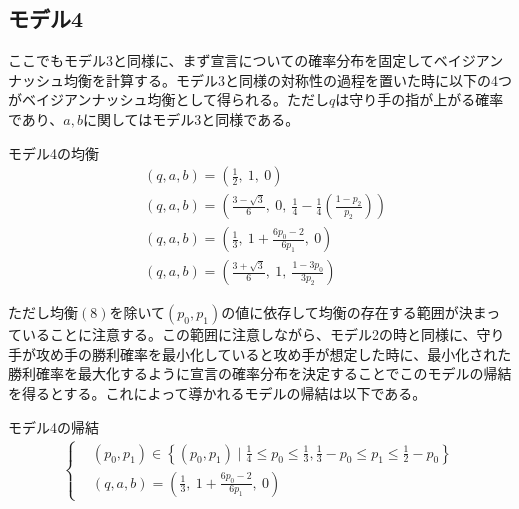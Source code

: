 \documentclass{jsarticle}
\begin{document}
\subsection{モデル4}
ここでもモデル3と同様に、まず宣言についての確率分布を固定してベイジアンナッシュ均衡を計算する。モデル3と同様の対称性の過程を置いた時に以下の4つがベイジアンナッシュ均衡として得られる。ただし$q$は守り手の指が上がる確率であり、$a,b$に関してはモデル3と同様である。
\begin{itembox}[l]{モデル4の均衡}
\begin{align}
&(q, a, b) = \left(\frac{1}{2},\ 1,\ 0\right)\\[7pt]
&(q, a, b) = \left(\frac{3 - \sqrt{3}}{6},\ 0,\ \frac{1}{4} - \frac{1}{4}\left( \frac{1-p_2}{p_2} \right) \right)\\[7pt]
&(q, a, b) = \left( \frac{1}{3},\ 1 + \frac{6p_0 - 2}{6p_1},\ 0 \right)\\[7pt]
&(q, a, b) = \left( \frac{3 + \sqrt{3}}{6},\ 1,\ \frac{1 - 3p_0}{3p_2} \right)
\end{align}
\end{itembox}
ただし均衡$(8)$を除いて$(p_0, p_1)$の値に依存して均衡の存在する範囲が決まっていることに注意する。この範囲に注意しながら、モデル2の時と同様に、守り手が攻め手の勝利確率を最小化していると攻め手が想定した時に、最小化された勝利確率を最大化するように宣言の確率分布を決定することでこのモデルの帰結を得るとする。これによって導かれるモデルの帰結は以下である。
\begin{itembox}[l]{モデル4の帰結}
\begin{align}
\begin{cases}
&(p_0, p_1) \in \left\{ (p_0, p_1) \mid \frac{1}{4} \leq p_0 \leq \frac{1}{3}, \frac{1}{3} -p_0 \leq p_1 \leq \frac{1}{2} - p_0 \right\}\\[6pt]
&(q, a, b) = \left( \frac{1}{3},\ 1 + \frac{6p_0 - 2}{6p_1},\ 0 \right)
\end{cases}
\end{align}
\end{itembox}
\end{document}
